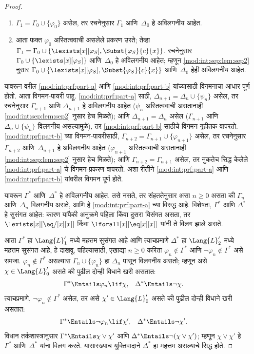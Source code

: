 \begin{proof}
\begin{enumerate}
  \ref{mod:int:prf:part-a} होय.
\item $\Gamma_1 = \Gamma_0 \cup\{ \varphi_0\}$ असेल, तर रचनेनुसार
  $\Gamma_1$ आणि~$\Delta_0$ हे अविलगनीय आहेत.
\item आता फक्त $\varphi_0$ अस्तित्ववाची असलेले प्रकरण उरते; तेव्हा
  $\Gamma_1 = \Gamma_0 \cup \{ \lexists[x][\varphi_{S}], \Subst{\varphi_{S}}{c}{x}
  \}$. रचनेनुसार $\Gamma_0 \cup \{ \lexists[x][\varphi_{S}]\}$ आणि~$\Delta_0$
  हे अविलगनीय आहेत; म्हणून \ref{mod:int:sep:lem:sep2} नुसार $\Gamma_0 \cup
  \{ \lexists[x][\varphi_{S}], \Subst{\varphi_{S}}{c}{x} \}$ आणि~$\Delta_0$ हेही
  अविलगनीय आहेत.
\end{enumerate}
यावरून वरील \ref{mod:int:prf:part-a} आणि \ref{mod:int:prf:part-b} यांच्यासाठी विगमनाचा आधार
पूर्ण होतो. आता विगमन-पायरी पाहू. \ref{mod:int:prf:part-a} साठी, $\Delta_{n+1} =
\Delta_n \cup \{ \psi_n \}$ असेल, तर रचनेनुसार $\Gamma_{n+1}$ आणि
$\Delta_{n+1}$ हे अविलगनीय आहेत ($\psi_n$ अस्तित्ववाची असतानाही
\ref{mod:int:sep:lem:sep2} नुसार हेच मिळते); आणि $\Delta_{n+1} = \Delta_n$
असेल ($\Gamma_{n+1}$ आणि~$\Delta_n \cup \{\psi_n\}$ विलगनीय असल्यामुळे),
तर \ref{mod:int:prf:part-b} साठीचे विगमन-गृहीतक वापरतो. \ref{mod:int:prf:part-b} च्या
विगमन-पायरीसाठी, $\Gamma_{n+2} = \Gamma_{n+1} \cup \{\varphi_{n+1} \}$
असेल, तर रचनेनुसार $\Gamma_{n+2}$ आणि~$\Delta_{n+1}$ हे अविलगनीय आहेत
($\varphi_{n+1}$ अस्तित्ववाची असतानाही \ref{mod:int:sep:lem:sep2} नुसार हेच
मिळते); आणि $\Gamma_{n+2} = \Gamma_{n+1}$ असेल, तर नुकतेच सिद्ध केलेले
\ref{mod:int:prf:part-a} चे विगमन-प्रकरण वापरतो. अशा रीतीने \ref{mod:int:prf:part-a} आणि
\ref{mod:int:prf:part-b} यांवरील विगमन पूर्ण होते.

यावरून $\Gamma^*$ आणि~$\Delta^*$ हे अविलगनीय आहेत. तसे नसते, तर
संहततेनुसार असा $n \ge 0$ असता की $\Gamma_n$ आणि~$\Delta_n$ विलगनीय
असते, आणि हे \ref{mod:int:prf:part-a} च्या विरुद्ध आहे. विशेषतः, $\Gamma^*$ आणि
$\Delta^*$ हे सुसंगत आहेत: कारण यांपैकी अनुक्रमे पहिला किंवा दुसरा विसंगत
असता, तर $\lexists[x][\eq/[x][x]]$ किंवा
$\lforall[x][\eq[x][x]]$ यांनी ते विलग झाले असते.

आता $\Gamma^*$ हा $\Lang{L}'_1$ मध्ये महत्तम सुसंगत आहे आणि त्याचप्रमाणे
$\Delta^*$ हा $\Lang{L}'_2$ मध्ये महत्तम सुसंगत आहे, हे दाखवू. पहिल्यासाठी,
एखाद्या $n \ge 0$ करिता $\varphi_n \notin \Gamma^*$ आणि $\lnot \varphi_n
\notin \Gamma^*$ असे समजा. $\varphi_n \notin \Gamma^*$ असल्यास $\Gamma_n
\cup \{\varphi_n \}$ हा $\Delta_n$ पासून विलगनीय असतो; म्हणून असे
$\chi \in \Lang{L}'_0$ असते की पुढील दोन्ही विधाने खरी असतात:
\begin{align*}
  \Gamma^* & \Entails \varphi_n \lif \chi, &
  \Delta^* & \Entails \lnot \chi.
\end{align*}
त्याचप्रमाणे, $\lnot \varphi_n \notin \Gamma^*$ असेल, तर असे $\chi' \in
\Lang{L}'_0$ असते की पुढील दोन्ही विधाने खरी असतात:
\begin{align*}
  \Gamma^* & \Entails \lnot \varphi_n \lif \chi', &
  \Delta^* & \Entails \lnot \chi'.
\end{align*}
विधान तर्कशास्त्रानुसार $\Gamma^* \Entails \chi \lor \chi'$ आणि
$\Delta^* \Entails \lnot (\chi \lor \chi')$; म्हणून $\chi \lor \chi'$ हे
$\Gamma^*$ आणि~$\Delta^*$ यांना विलग करते. यासारख्याच युक्तिवादाने
$\Delta^*$ हा महत्तम असल्याचे सिद्ध होते.


\end{proof}
